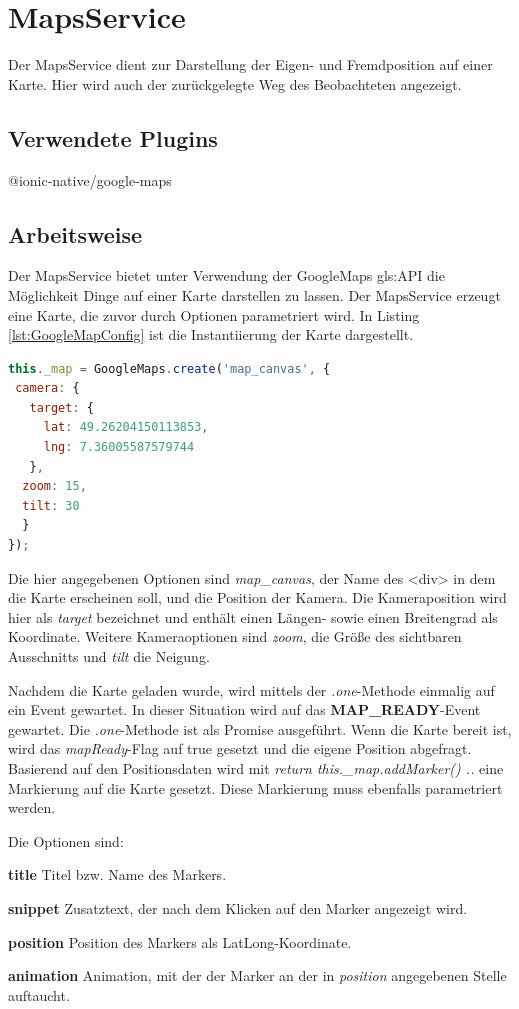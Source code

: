 \section{MapsService}
\label{MapsService}
Der MapsService dient zur Darstellung der Eigen- und Fremdposition auf einer Karte. Hier wird auch der zurückgelegte Weg des Beobachteten angezeigt.
 
\subsection{Verwendete Plugins}
@ionic-native/google-maps \cite{GoogleMapsPluginDoku}
\subsection{Arbeitsweise}
Der MapsService bietet unter Verwendung der GoogleMaps \gls{gls:API} die Möglichkeit Dinge auf einer Karte darstellen zu lassen.
Der MapsService erzeugt eine Karte, die zuvor durch Optionen parametriert wird. In Listing \ref{lst:GoogleMapConfig} ist die Instantiierung der Karte dargestellt.

\begin{lstlisting}[float, language=JavaScript, caption= Instantiierung GoogleMap, label=lst:GoogleMapConfig]
this._map = GoogleMaps.create('map_canvas', {
 camera: {
   target: {
     lat: 49.26204150113853,
     lng: 7.36005587579744
   },
  zoom: 15,
  tilt: 30
  }
});
\end{lstlisting}

Die hier angegebenen Optionen sind \emph{map\_canvas}, der Name des <div> in dem die Karte erscheinen soll, und die Position der Kamera. Die Kameraposition wird hier als \emph{target} bezeichnet und enthält einen Längen- sowie einen Breitengrad als Koordinate. Weitere Kameraoptionen sind \emph{zoom}, die Größe des sichtbaren Ausschnitts und \emph{tilt} die Neigung. 

Nachdem die Karte geladen wurde, wird mittels der \emph{.one}-Methode einmalig auf ein Event gewartet. In dieser Situation wird auf das \textbf{MAP\_READY}-Event gewartet. Die \emph{.one}-Methode ist als Promise ausgeführt. Wenn die Karte bereit ist, wird das \emph{mapReady}-Flag auf true gesetzt und die eigene Position abgefragt. Basierend auf den Positionsdaten wird mit \glqq \emph{return this.\_map.addMarker() .. }\grqq{}
eine Markierung auf die Karte gesetzt. Diese Markierung muss ebenfalls parametriert werden. 

Die Optionen sind: 
\begin{description}
\item \textbf{title} Titel bzw. Name des Markers.
\item \textbf{snippet} Zusatztext, der nach dem Klicken auf den Marker angezeigt wird.
\item \textbf{position} Position des Markers als LatLong-Koordinate.
\item \textbf{animation} Animation, mit der der Marker an der in \emph{position} angegebenen Stelle auftaucht.
\end{description}

